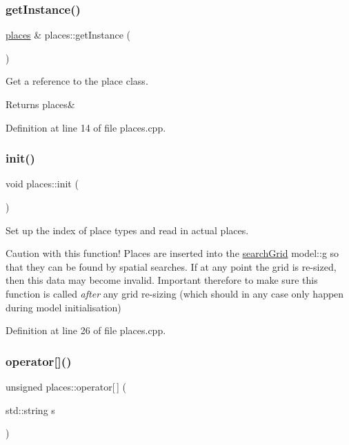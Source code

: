 \subsubsection{\texorpdfstring{get\+Instance()}{getInstance()}}
{\footnotesize\ttfamily \mbox{\hyperlink{classplaces}{places}} \& places\+::get\+Instance (\begin{DoxyParamCaption}{ }\end{DoxyParamCaption})\hspace{0.3cm}{\ttfamily [static]}}



Get a reference to the place class. 

\begin{DoxyReturn}{Returns}
places\& 
\end{DoxyReturn}


Definition at line 14 of file places.\+cpp.

\mbox{\label{classplaces_ad126c2796c4fecad43f8e237ffde786d}} 
\subsubsection{\texorpdfstring{init()}{init()}}
{\footnotesize\ttfamily void places\+::init (\begin{DoxyParamCaption}{ }\end{DoxyParamCaption})}



Set up the index of place types and read in actual places. 

Caution with this function! Places are inserted into the \mbox{\hyperlink{classsearchGrid}{search\+Grid}} model\+::g so that they can be found by spatial searches. If at any point the grid is re-\/sized, then this data may become invalid. Important therefore to make sure this function is called {\itshape after} any grid re-\/sizing (which should in any case only happen during model initialisation) 

Definition at line 26 of file places.\+cpp.

\mbox{\label{classplaces_a18b24350e2ad05ef273df442b6d22593}} 
\subsubsection{\texorpdfstring{operator[]()}{operator[]()}}
{\footnotesize\ttfamily unsigned places\+::operator\mbox{[}$\,$\mbox{]} (\begin{DoxyParamCaption}\item[{std\+::string}]{s }\end{DoxyParamCaption})}



